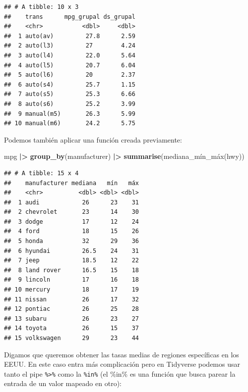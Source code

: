 \documentclass[
]{article}
\newenvironment{Shaded}{\begin{snugshade}}{\end{snugshade}}
\newcommand{\FunctionTok}[1]{\textcolor[rgb]{0.13,0.29,0.53}{\textbf{#1}}}
\newcommand{\NormalTok}[1]{#1}
\newcommand{\SpecialCharTok}[1]{\textcolor[rgb]{0.81,0.36,0.00}{\textbf{#1}}}
\begin{document}
\begin{verbatim}
## # A tibble: 10 x 3
##    trans      mpg_grupal ds_grupal
##    <chr>           <dbl>     <dbl>
##  1 auto(av)         27.8      2.59
##  2 auto(l3)         27        4.24
##  3 auto(l4)         22.0      5.64
##  4 auto(l5)         20.7      6.04
##  5 auto(l6)         20        2.37
##  6 auto(s4)         25.7      1.15
##  7 auto(s5)         25.3      6.66
##  8 auto(s6)         25.2      3.99
##  9 manual(m5)       26.3      5.99
## 10 manual(m6)       24.2      5.75
\end{verbatim}

Podemos también aplicar una función creada previamente:

\begin{Shaded}
\begin{Highlighting}[]
\NormalTok{mpg }\SpecialCharTok{|\textgreater{}} \FunctionTok{group\_by}\NormalTok{(manufacturer) }\SpecialCharTok{|\textgreater{}} \FunctionTok{summarise}\NormalTok{(mediana\_mín\_máx(hwy))}
\end{Highlighting}
\end{Shaded}

\begin{verbatim}
## # A tibble: 15 x 4
##    manufacturer mediana   mín   máx
##    <chr>          <dbl> <dbl> <dbl>
##  1 audi            26      23    31
##  2 chevrolet       23      14    30
##  3 dodge           17      12    24
##  4 ford            18      15    26
##  5 honda           32      29    36
##  6 hyundai         26.5    24    31
##  7 jeep            18.5    12    22
##  8 land rover      16.5    15    18
##  9 lincoln         17      16    18
## 10 mercury         18      17    19
## 11 nissan          26      17    32
## 12 pontiac         26      25    28
## 13 subaru          26      23    27
## 14 toyota          26      15    37
## 15 volkswagen      29      23    44
\end{verbatim}

Digamos que queremos obtener las tasas medias de regiones específicas en
los EEUU. En este caso entra más complicación pero en Tidyverse podemos
usar tanto el pipe \texttt{\%\textgreater{}\%} como la \texttt{\%in\%}
(el \%in\% es una función que busca parear la entrada de un valor
mapeado en otro):
\end{document}
